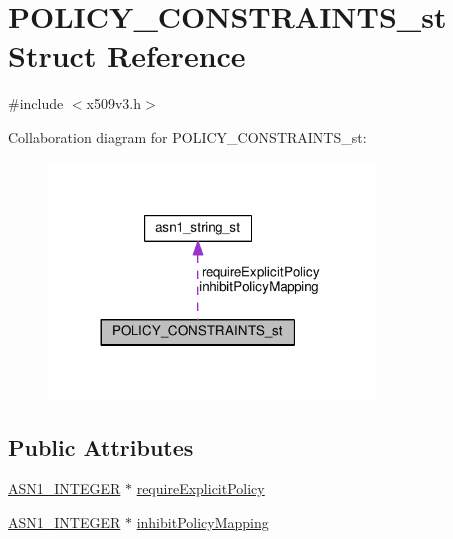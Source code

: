 \hypertarget{struct_p_o_l_i_c_y___c_o_n_s_t_r_a_i_n_t_s__st}{}\section{P\+O\+L\+I\+C\+Y\+\_\+\+C\+O\+N\+S\+T\+R\+A\+I\+N\+T\+S\+\_\+st Struct Reference}
\label{struct_p_o_l_i_c_y___c_o_n_s_t_r_a_i_n_t_s__st}


{\ttfamily \#include $<$x509v3.\+h$>$}



Collaboration diagram for P\+O\+L\+I\+C\+Y\+\_\+\+C\+O\+N\+S\+T\+R\+A\+I\+N\+T\+S\+\_\+st\+:
\nopagebreak
\begin{figure}[H]
\begin{center}
\leavevmode
\includegraphics[width=245pt]{struct_p_o_l_i_c_y___c_o_n_s_t_r_a_i_n_t_s__st__coll__graph}
\end{center}
\end{figure}
\subsection*{Public Attributes}
\begin{DoxyCompactItemize}
\item 
\hyperlink{ossl__typ_8h_af4335399bf9774cb410a5e93de65998b}{A\+S\+N1\+\_\+\+I\+N\+T\+E\+G\+ER} $\ast$ \hyperlink{struct_p_o_l_i_c_y___c_o_n_s_t_r_a_i_n_t_s__st_ac20a75b7ea96a9f0c0449966cdbe77b8}{require\+Explicit\+Policy}
\item 
\hyperlink{ossl__typ_8h_af4335399bf9774cb410a5e93de65998b}{A\+S\+N1\+\_\+\+I\+N\+T\+E\+G\+ER} $\ast$ \hyperlink{struct_p_o_l_i_c_y___c_o_n_s_t_r_a_i_n_t_s__st_a1621bfef679b688916f7ec401d071c01}{inhibit\+Policy\+Mapping}
\end{DoxyCompactItemize}


